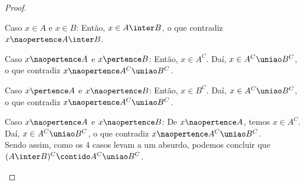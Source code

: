 \begin{proof}
\begin{enumerate}
\begin{enumerate}
				Caso $x \in A$ e $x \in B$: Então, $x \in A \inter B$, o que contradiz $x \naopertence A \inter B$.

				Caso $x \naopertence A$ e $x \pertence B$: Então, $x \in A^C$. Daí, $x \in A^C \uniao B^C$, o que contradiz $x \naopertence A^C \uniao B^C$.

				Caso $x \pertence A$ e $x \naopertence B$: Então, $x \in B^C$. Daí, $x \in A^C \uniao B^C$, o que contradiz $x \naopertence A^C \uniao B^C$.

				Caso $x \naopertence A$ e $x \naopertence B$: De $x \naopertence A$, temos $x \in A^C$. Daí, $x \in A^C \uniao B^C$, o que contradiz $x \naopertence A^C \uniao B^C$.\\
				Sendo assim, como os 4 casos levam a um absurdo, podemos concluir que $(A \inter B)^C \contido A^C \uniao B^C$.
			\end{enumerate}	
	\end{enumerate}
\end{proof}
